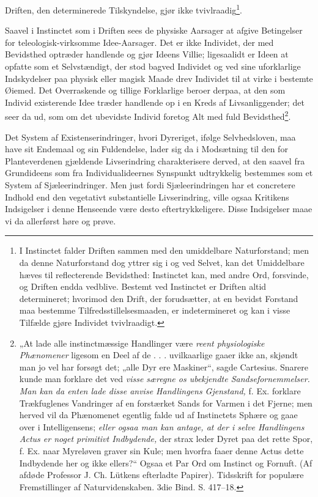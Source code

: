 \documentclass[12pt,a4paper]{book}
\begin{document}
\setcounter{footnote}{0}
Driften, den determinerede Tilskyndelse, gjør ikke tvivlraadig\footnote{I
Instinctet falder Driften sammen med den umiddelbare Naturforstand; men da denne
Naturforstand dog yttrer sig i og ved Selvet, kan det Umiddelbare hæves til
reflecterende Bevidsthed: Instinctet kan, med andre Ord, forsvinde, og Driften
endda vedblive. Bestemt ved Instinctet er Driften altid determineret; hvorimod
den Drift, der forudsætter, at en bevidst Forstand maa bestemme
Tilfredsstillelsesmaaden, er indetermineret og kan i visse Tilfælde gjøre
Individet tvivlraadigt.}.

Saavel i Instinctet som i Driften sees de physiske Aarsager at afgive
Betingelser for teleologisk-virksomme Idee-Aarsager. Det er ikke Individet, der
med Bevidsthed optræder handlende og gjør Ideens Villie; ligesaalidt er Ideen at
opfatte som et Selvstændigt, der stod bagved Individet og ved sine uforklarlige
Indskydelser paa physisk eller magisk Maade drev Individet til at virke i
bestemte Øiemed. Det Overraskende og tillige Forklarlige beroer derpaa, at den
som Individ existerende Idee træder handlende op i en Kreds af Livsanliggender;
det seer da ud, som om det ubevidste Individ foretog Alt med fuld
Bevidsthed\footnote{„At lade alle instinctmæssige Handlinger være \emph{reent
physiologiske Phænomener} ligesom en Deel af de . . . uvilkaarlige gaaer ikke
an, skjøndt man jo vel har forsøgt det; „alle Dyr ere Maskiner“, sagde
Cartesius. Snarere kunde man forklare det ved \emph{visse særegne os ubekjendte
Sandsefornemmelser. Man kan da enten lade disse anvise Handlingens Gjenstand,}
f. Ex. forklare Trækfuglenes Vandringer af en forstærket Sands for Varmen i det
Fjerne; men herved vil da Phænomenet egentlig falde ud af Instinctets Sphære og
gaae over i Intelligensens; \emph{eller ogsaa man kan antage, at der i selve
Handlingens Actus er noget primitivt Indbydende,} der strax leder Dyret paa det
rette Spor, f. Ex. naar Myreløven graver sin Kule; men hvorfra faaer denne Actus
dette Indbydende her og ikke ellers?“ Ogsaa et Par Ord om Instinct og Fornuft.
(Af afdøde Professor J. Ch. Lütkens efterladte Papirer). Tidsskrift for populære
Fremstillinger af Naturvidenskaben. 3die Bind. S. 417--18.}.

Det System af Existenserindringer, hvori Dyreriget, ifølge Selvhedsloven, maa
have sit Endemaal og sin Fuldendelse, lader sig da i Modsætning til den for
Planteverdenen gjældende Livserindring charakterisere derved, at den saavel fra
Grundideens som fra Individualideernes Synspunkt udtrykkelig bestemmes som et
System af Sjæleerindringer. Men just fordi Sjæleerindringen har et concretere
Indhold end den vegetativt substantielle Livserindring, ville ogsaa Kritikens
Indsigelser i denne Henseende være desto eftertrykkeligere. Disse Indsigelser
maae vi da allerførst høre og prøve.
\end{document}
